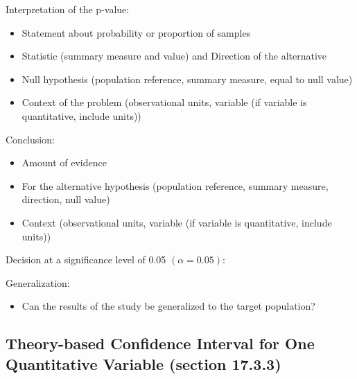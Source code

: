 \documentclass[
]{report}
\providecommand{\tightlist}{%
  \setlength{\itemsep}{0pt}\setlength{\parskip}{0pt}}
\begin{document}
Interpretation of the p-value:

\begin{itemize}
\item
  Statement about probability or proportion of samples
\item
  Statistic (summary measure and value) and Direction of the alternative
\item
  Null hypothesis (population reference, summary measure, equal to null value)
\item
  Context of the problem (observational units, variable (if variable is quantitative, include units))
\end{itemize}

\vspace{0.6in}

Conclusion:

\begin{itemize}
\item
  Amount of evidence
\item
  For the alternative hypothesis (population reference, summary measure, direction, null value)
\item
  Context (observational units, variable (if variable is quantitative, include units))
\end{itemize}

\vspace{0.5in}

Decision at a significance level of 0.05 \((\alpha = 0.05)\):

\vspace{0.3in}

Generalization:

\begin{itemize}
\tightlist
\item
  Can the results of the study be generalized to the target population?
\end{itemize}

\vspace{0.4in}

\subsection*{Theory-based Confidence Interval for One Quantitative Variable (section 17.3.3)}\label{theory-based-confidence-interval-for-one-quantitative-variable-section-17.3.3}

\end{document}

